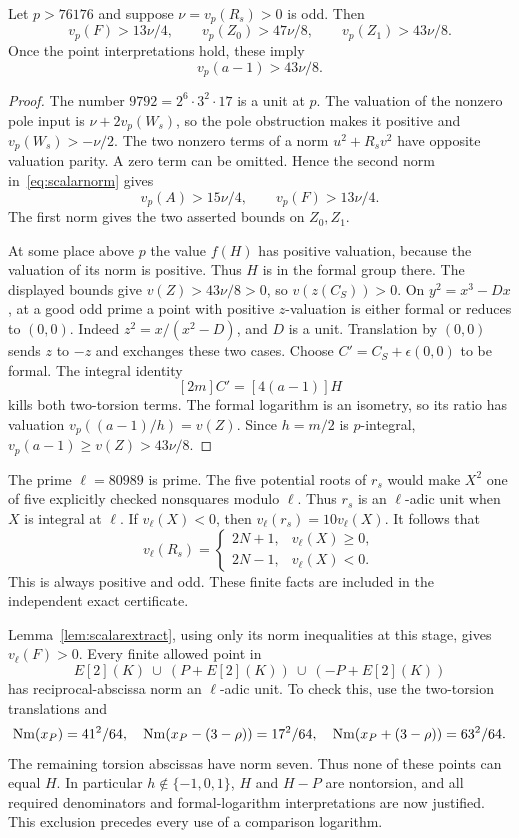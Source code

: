 \documentclass[11pt,a4paper]{article}
\begin{document}
\begin{lemma}\label{lem:scalarextract}
Let $p>76176$ and suppose $\nu=v_p(R_s)>0$ is odd. Then
\[
 v_p(F)>13\nu/4,\qquad
 v_p(Z_0)>47\nu/8,\qquad v_p(Z_1)>43\nu/8.
\]
Once the point interpretations hold, these imply
\[
                v_p(a-1)>43\nu/8.
\]
\end{lemma}
\begin{proof}
The number $9792=2^6\cdot3^2\cdot17$ is a unit at $p$.
The valuation of the nonzero pole input is
$\nu+2v_p(W_s)$, so the pole obstruction makes it positive and
$v_p(W_s)>-\nu/2$.
The two nonzero terms of a norm $u^2+R_sv^2$ have opposite
valuation parity. A zero term can be omitted. Hence the second
norm in~\eqref{eq:scalarnorm} gives
\[
 v_p(A)>15\nu/4,\qquad v_p(F)>13\nu/4.
\]
The first norm gives the two asserted bounds on $Z_0,Z_1$.

At some place above $p$ the value $f(H)$ has positive valuation,
because the valuation of its norm is positive. Thus $H$ is in the
formal group there. The displayed bounds give $v(Z)>43\nu/8>0$,
so $v(z(C_S))>0$. On $y^2=x^3-Dx$, at a good odd prime a point
with positive $z$-valuation is either formal or reduces to $(0,0)$.
Indeed $z^2=x/(x^2-D)$, and $D$ is a unit. Translation by $(0,0)$
sends $z$ to $-z$ and exchanges these two cases. Choose
$C'=C_S+\epsilon(0,0)$ to be formal. The integral identity
\[
                       [2m]C'=[4(a-1)]H
\]
kills both two-torsion terms. The formal logarithm is an isometry,
so its ratio has valuation $v_p((a-1)/h)=v(Z)$. Since $h=m/2$ is
$p$-integral, $v_p(a-1)\ge v(Z)>43\nu/8$.
\end{proof}

The prime $\ell=80989$ is prime. The five potential roots of
$r_s$ would make $X^2$ one of five explicitly checked nonsquares
modulo $\ell$. Thus $r_s$ is an $\ell$-adic unit when $X$ is integral
at $\ell$. If $v_\ell(X)<0$, then $v_\ell(r_s)=10v_\ell(X)$.
It follows that
\begin{equation}\label{eq:forcedvaluation}
 v_\ell(R_s)=
 \begin{cases}2N+1,&v_\ell(X)\ge0,\\2N-1,&v_\ell(X)<0.
 \end{cases}
\end{equation}
This is always positive and odd. These finite facts are included
in the independent exact certificate.

Lemma~\ref{lem:scalarextract}, using only its norm inequalities at
this stage, gives $v_\ell(F)>0$. Every finite allowed point in
\[
                E[2](K)\ \cup\ (P+E[2](K))\ \cup\ (-P+E[2](K))
\]
has reciprocal-abscissa norm an $\ell$-adic unit. To check this,
use the two-torsion translations and
\[
 \operatorname{Nm}(x_P)=41^2/64,\quad
 \operatorname{Nm}(x_P-(3-\rho))=17^2/64,\quad
 \operatorname{Nm}(x_P+(3-\rho))=63^2/64.
\]
The remaining torsion abscissas have norm seven. Thus none of
these points can equal $H$. In particular $h\notin\{-1,0,1\}$,
$H$ and $H-P$ are nontorsion, and all required denominators and
formal-logarithm interpretations are now justified. This exclusion
precedes every use of a comparison logarithm.
\end{document}
